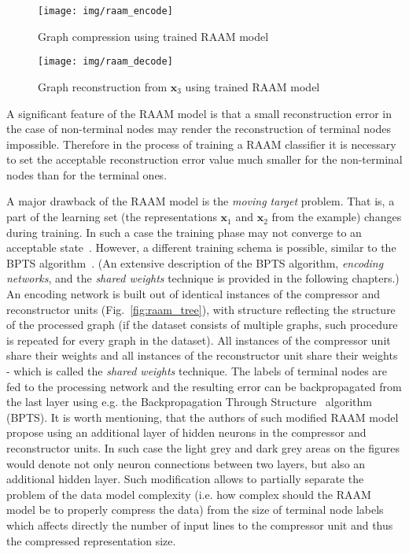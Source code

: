 \begin{figure}
\begin{center}
	\texttt{[image: img/raam\_encode]}
	\caption{Graph compression using trained RAAM model}
	\label{fig:raam_compression}
\end{center}
\end{figure}

\begin{figure}
\begin{center}
	\texttt{[image: img/raam\_decode]}
	\caption{Graph reconstruction from $\bm{x}_3$ using trained RAAM model}
	\label{fig:raam_reconstruction}
\end{center}
\end{figure}

A significant feature of the RAAM model is that a small reconstruction error in the case of non-terminal nodes may render the reconstruction of terminal nodes impossible. Therefore in the process of training a RAAM classifier it is necessary to set the acceptable reconstruction error value much smaller for the non-terminal nodes than for the terminal ones.

A major drawback of the RAAM model is the \emph{moving target} problem. That is, a part of the learning set (the representations $\bm{x}_1$ and $\bm{x}_2$ from the example) changes during training. In such a case the training phase may not converge to an acceptable state~\cite{goulon2005hopfield}. However, a different training schema is possible, similar to the BPTS algorithm~\cite{goulon2005hopfield}. (An extensive description of the BPTS algorithm, \emph{encoding networks}, and the \emph{shared weights} technique is provided in the following chapters.) An encoding network is built out of identical instances of the compressor and reconstructor units (Fig.~\ref{fig:raam_tree}), with structure reflecting the structure of the processed graph (if the dataset consists of multiple graphs, such procedure is repeated for every graph in the dataset). All instances of the compressor unit share their weights and all instances of the reconstructor unit share their weights - which is called the \emph{shared weights} technique. The labels of terminal nodes are fed to the processing network and the resulting error can be backpropagated from the last layer using e.g. the Backpropagation Through Structure~\cite{kuchler1996inductive} algorithm (BPTS). It is worth mentioning, that the authors of such modified RAAM model propose using an additional layer of hidden neurons in the compressor and reconstructor units. In such case the light grey and dark grey areas on the figures would denote not only neuron connections between two layers, but also an additional hidden layer. Such modification allows to partially separate the problem of the data model complexity (i.e. how complex should the RAAM model be to properly compress the data) from the size of terminal node labels which affects directly the number of input lines to the compressor unit and thus the compressed representation size.

